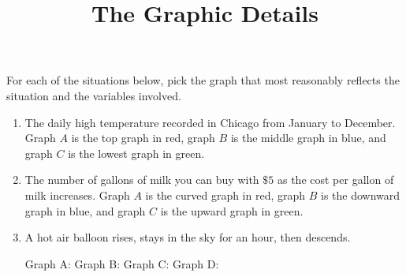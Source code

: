 \documentclass[nooutcomes,noauthor,handout]{ximera}
\title{The Graphic Details}
\begin{document}
\begin{abstract}\end{abstract}
\maketitle


\begin{problem}
For each of the situations below, pick the graph that most reasonably
reflects the situation and the variables involved.

\begin{enumerate}
\item The daily high temperature recorded in Chicago from January to
  December. Graph $A$ is the top graph in red, graph $B$ is the middle graph 
  in blue, and graph $C$ is the lowest graph in green.

\begin{center}
\end{center}

\item The number of gallons of milk you can buy with $\$5$ as the cost per gallon of
  milk increases. Graph $A$ is the curved graph in red, graph $B$ is the downward graph 
  in blue, and graph $C$ is the upward graph in green.

\begin{center}
\end{center}

\newpage


\item A hot air balloon rises, stays in the sky for an hour, then descends.

Graph A: 
Graph B: 
Graph C: 
Graph D: 


\end{enumerate}
\end{problem}
\end{document}
